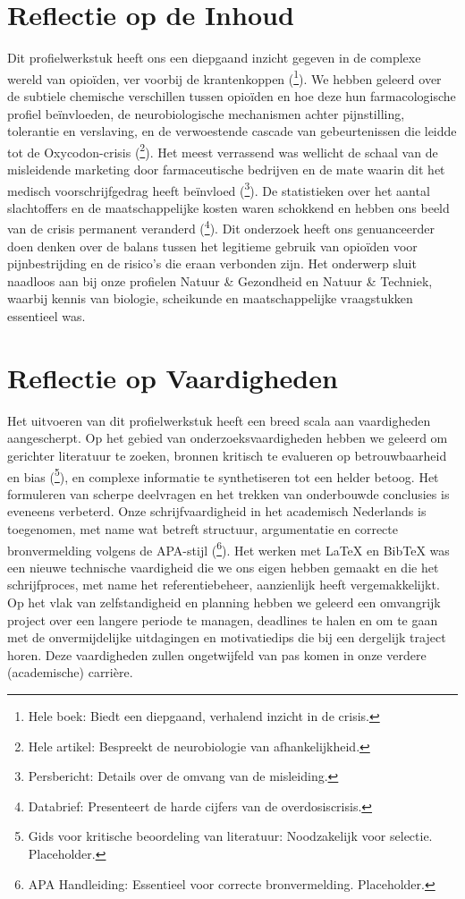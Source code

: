 \documentclass[11pt, a4paper]{report} %
\begin{document}
\section{Reflectie op de Inhoud}
Dit profielwerkstuk heeft ons een diepgaand inzicht gegeven in de complexe wereld van opioïden, ver voorbij de krantenkoppen (\cite{Macy2018Dopesick}\footnote{Hele boek: Biedt een diepgaand, verhalend inzicht in de crisis.}). We hebben geleerd over de subtiele chemische verschillen tussen opioïden en hoe deze hun farmacologische profiel beïnvloeden, de neurobiologische mechanismen achter pijnstilling, tolerantie en verslaving, en de verwoestende cascade van gebeurtenissen die leidde tot de Oxycodon-crisis (\cite{Kosten2002NeurobiologyDependence}\footnote{Hele artikel: Bespreekt de neurobiologie van afhankelijkheid.}). Het meest verrassend was wellicht de schaal van de misleidende marketing door farmaceutische bedrijven en de mate waarin dit het medisch voorschrijfgedrag heeft beïnvloed (\cite{JusticeDeptPurdueResolution}\footnote{Persbericht: Details over de omvang van de misleiding.}). De statistieken over het aantal slachtoffers en de maatschappelijke kosten waren schokkend en hebben ons beeld van de crisis permanent veranderd (\cite{CDC2024DataBrief491}\footnote{Databrief: Presenteert de harde cijfers van de overdosiscrisis.}). Dit onderzoek heeft ons genuanceerder doen denken over de balans tussen het legitieme gebruik van opioïden voor pijnbestrijding en de risico's die eraan verbonden zijn. Het onderwerp sluit naadloos aan bij onze profielen Natuur \& Gezondheid en Natuur \& Techniek, waarbij kennis van biologie, scheikunde en maatschappelijke vraagstukken essentieel was.

\section{Reflectie op Vaardigheden}
Het uitvoeren van dit profielwerkstuk heeft een breed scala aan vaardigheden aangescherpt. Op het gebied van onderzoeksvaardigheden hebben we geleerd om gerichter literatuur te zoeken, bronnen kritisch te evalueren op betrouwbaarheid en bias (\cite{SomeCriticalAppraisalGuide}\footnote{Gids voor kritische beoordeling van literatuur: Noodzakelijk voor selectie. Placeholder.}), en complexe informatie te synthetiseren tot een helder betoog. Het formuleren van scherpe deelvragen en het trekken van onderbouwde conclusies is eveneens verbeterd. Onze schrijfvaardigheid in het academisch Nederlands is toegenomen, met name wat betreft structuur, argumentatie en correcte bronvermelding volgens de APA-stijl (\cite{APAStyleManualReference}\footnote{APA Handleiding: Essentieel voor correcte bronvermelding. Placeholder.}). Het werken met LaTeX en BibTeX was een nieuwe technische vaardigheid die we ons eigen hebben gemaakt en die het schrijfproces, met name het referentiebeheer, aanzienlijk heeft vergemakkelijkt. Op het vlak van zelfstandigheid en planning hebben we geleerd een omvangrijk project over een langere periode te managen, deadlines te halen en om te gaan met de onvermijdelijke uitdagingen en motivatiedips die bij een dergelijk traject horen. Deze vaardigheden zullen ongetwijfeld van pas komen in onze verdere (academische) carrière.
\end{document}
